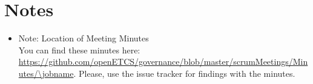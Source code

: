 \documentclass[a4paper, 11pt]{article}
\begin{document}
\section{Notes}
\begin{itemize}

\item Note: Location of Meeting Minutes\\
You can find these minutes here: \url{https://github.com/openETCS/governance/blob/master/scrumMeetings/Minutes/\jobname}. Please, use the issue tracker for findings with the minutes.

\end{itemize}
\end{document}
